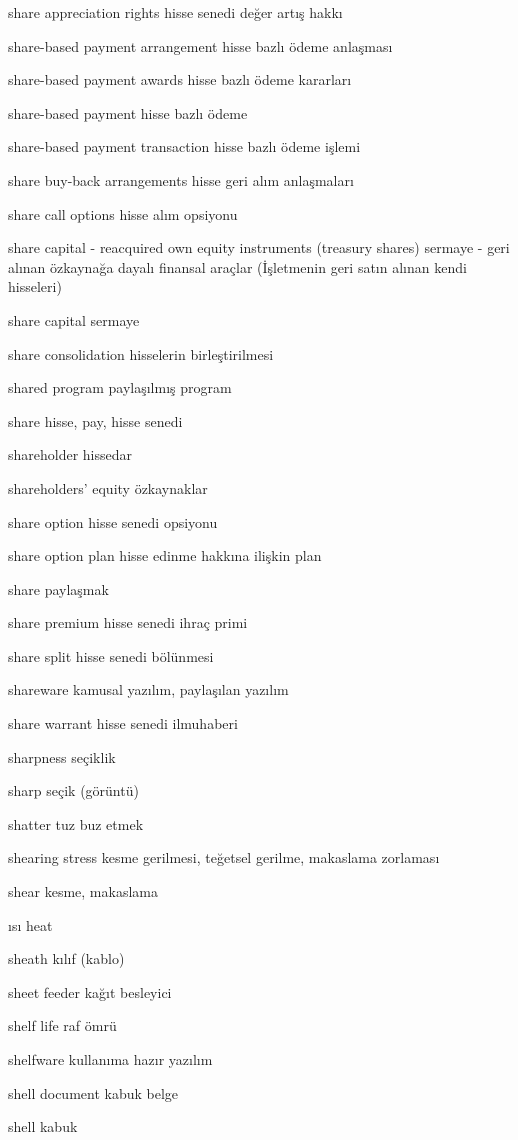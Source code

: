 \documentclass[12pt,fleqn]{article}\usepackage{../../common}
\begin{document}
share appreciation rights hisse senedi değer artış hakkı

share-based payment arrangement hisse bazlı ödeme anlaşması

share-based payment awards hisse bazlı ödeme kararları

share-based payment hisse bazlı ödeme

share-based payment transaction hisse bazlı ödeme işlemi

share buy-back arrangements hisse geri alım anlaşmaları

share call options hisse alım opsiyonu

share capital - reacquired own equity instruments (treasury shares) sermaye - geri alınan özkaynağa dayalı finansal araçlar (İşletmenin geri satın alınan kendi hisseleri)

share capital sermaye

share consolidation hisselerin birleştirilmesi

shared program paylaşılmış program

share hisse, pay, hisse senedi

shareholder hissedar

shareholders' equity özkaynaklar

share option hisse senedi opsiyonu

share option plan hisse edinme hakkına ilişkin plan

share paylaşmak

share premium hisse senedi ihraç primi

share split hisse senedi bölünmesi

shareware kamusal yazılım, paylaşılan yazılım

share warrant hisse senedi ilmuhaberi

sharpness seçiklik

sharp seçik (görüntü)

shatter tuz buz etmek

shearing stress kesme gerilmesi, teğetsel gerilme, makaslama zorlaması

shear kesme, makaslama

ısı heat

sheath kılıf (kablo)

sheet feeder kağıt besleyici

shelf life raf ömrü

shelfware kullanıma hazır yazılım

shell document kabuk belge

shell kabuk
\end{document}
